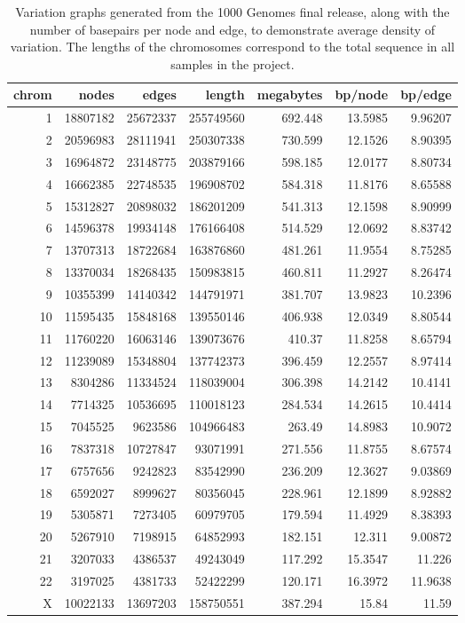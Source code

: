 \documentclass{article}
\begin{document}
\begin{table}[h!]
\begin{tabular}{ r || r | r | r | r | r | r }
chrom & nodes & edges & length & megabytes & bp/node & bp/edge \\
\hline
1 & 18807182 & 25672337 & 255749560 & 692.448 & 13.5985 & 9.96207 \\
2 & 20596983 & 28111941 & 250307338 & 730.599 & 12.1526 & 8.90395 \\
3 & 16964872 & 23148775 & 203879166 & 598.185 & 12.0177 & 8.80734 \\
4 & 16662385 & 22748535 & 196908702 & 584.318 & 11.8176 & 8.65588 \\
5 & 15312827 & 20898032 & 186201209 & 541.313 & 12.1598 & 8.90999 \\
6 & 14596378 & 19934148 & 176166408 & 514.529 & 12.0692 & 8.83742 \\
7 & 13707313 & 18722684 & 163876860 & 481.261 & 11.9554 & 8.75285 \\
8 & 13370034 & 18268435 & 150983815 & 460.811 & 11.2927 & 8.26474 \\
9 & 10355399 & 14140342 & 144791971 & 381.707 & 13.9823 & 10.2396 \\
10 & 11595435 & 15848168 & 139550146 & 406.938 & 12.0349 & 8.80544 \\
11 & 11760220 & 16063146 & 139073676 & 410.37 & 11.8258 & 8.65794 \\
12 & 11239089 & 15348804 & 137742373 & 396.459 & 12.2557 & 8.97414 \\
13 & 8304286 & 11334524 & 118039004 & 306.398 & 14.2142 & 10.4141 \\
14 & 7714325 & 10536695 & 110018123 & 284.534 & 14.2615 & 10.4414 \\
15 & 7045525 & 9623586 & 104966483 & 263.49 & 14.8983 & 10.9072 \\
16 & 7837318 & 10727847 & 93071991 & 271.556 & 11.8755 & 8.67574 \\
17 & 6757656 & 9242823 & 83542990 & 236.209 & 12.3627 & 9.03869 \\
18 & 6592027 & 8999627 & 80356045 & 228.961 & 12.1899 & 8.92882 \\
19 & 5305871 & 7273405 & 60979705 & 179.594 & 11.4929 & 8.38393 \\
20 & 5267910 & 7198915 & 64852993 & 182.151 & 12.311 & 9.00872 \\
21 & 3207033 & 4386537 & 49243049 & 117.292 & 15.3547 & 11.226 \\
22 & 3197025 & 4381733 & 52422299 & 120.171 & 16.3972 & 11.9638 \\
X & 10022133 & 13697203 & 158750551 & 387.294 & 15.84 & 11.59 \\
\end{tabular}

\caption{
Variation graphs generated from the 1000 Genomes final release, along with the number of basepairs per node and edge, to demonstrate average density of variation. The lengths of the chromosomes correspond to the total sequence in all samples in the project.
}
\label{tab:1000G}

\end{table}
\end{document}
